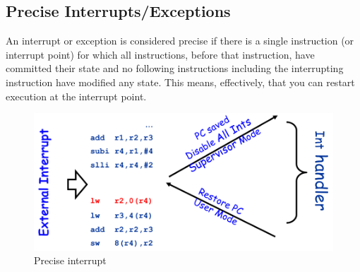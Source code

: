 \subsection{Precise Interrupts/Exceptions}\label{subsec:precise-interrupts/exceptions}
An interrupt or exception is considered precise if there is a single
instruction (or interrupt point) for which all instructions, before that
instruction, have committed their state and no following instructions
including the interrupting instruction have modified any state.
This means, effectively, that you can restart execution at the interrupt point.
\begin{figure}[h]
    \centering
    \includegraphics[scale = 0.4]{images/precise-interrupt}
    \caption{Precise interrupt}
    \label{fig:precise-interrupt}
\end{figure}


